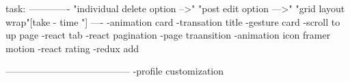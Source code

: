 task:
-------------
"individual delete option -->"
"post edit option --->"
"grid layout wrap"[take - time "]
----
-animation card
-transation title
-gesture card
-scroll to up page 
-react tab
-react pagination
-page  traansition
-animation icon framer motion
-react rating
-redux add

---------------------------------------
-profile customization

